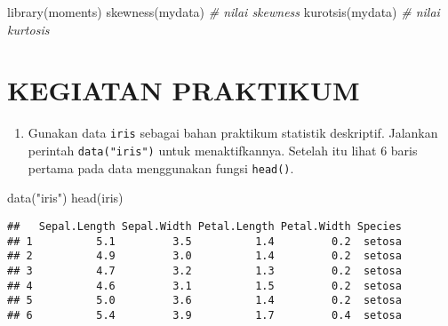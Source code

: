 \documentclass[
]{book}
\newenvironment{Shaded}{\begin{snugshade}}{\end{snugshade}}
\newcommand{\CommentTok}[1]{\textcolor[rgb]{0.56,0.35,0.01}{\textit{#1}}}
\newcommand{\FunctionTok}[1]{\textcolor[rgb]{0.00,0.00,0.00}{#1}}
\newcommand{\NormalTok}[1]{#1}
\newcommand{\StringTok}[1]{\textcolor[rgb]{0.31,0.60,0.02}{#1}}
\providecommand{\tightlist}{%
  \setlength{\itemsep}{0pt}\setlength{\parskip}{0pt}}
\begin{document}
\begin{Shaded}
\begin{Highlighting}[]
\FunctionTok{library}\NormalTok{(moments)}
\FunctionTok{skewness}\NormalTok{(mydata) }\CommentTok{\# nilai skewness}
\FunctionTok{kurotsis}\NormalTok{(mydata) }\CommentTok{\# nilai kurtosis}
\end{Highlighting}
\end{Shaded}

\hypertarget{kegiatan-praktikum}{%
\section{KEGIATAN PRAKTIKUM}\label{kegiatan-praktikum}}

\begin{enumerate}
\def\labelenumi{\arabic{enumi}.}
\tightlist
\item
  Gunakan data \texttt{iris} sebagai bahan praktikum statistik deskriptif. Jalankan perintah \texttt{data("iris")} untuk menaktifkannya. Setelah itu lihat 6 baris pertama pada data menggunakan fungsi \texttt{head()}.
\end{enumerate}

\begin{Shaded}
\begin{Highlighting}[]
\FunctionTok{data}\NormalTok{(}\StringTok{"iris"}\NormalTok{)}
\FunctionTok{head}\NormalTok{(iris)}
\end{Highlighting}
\end{Shaded}

\begin{verbatim}
##   Sepal.Length Sepal.Width Petal.Length Petal.Width Species
## 1          5.1         3.5          1.4         0.2  setosa
## 2          4.9         3.0          1.4         0.2  setosa
## 3          4.7         3.2          1.3         0.2  setosa
## 4          4.6         3.1          1.5         0.2  setosa
## 5          5.0         3.6          1.4         0.2  setosa
## 6          5.4         3.9          1.7         0.4  setosa
\end{verbatim}
\end{document}
